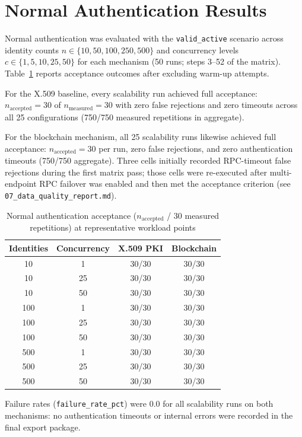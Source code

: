 
\section{Normal Authentication Results}
\label{sec:ch5-normal-auth}

Normal authentication was evaluated with the \texttt{valid\_active} scenario across identity counts $n \in \{10,50,100,250,500\}$ and concurrency levels $c \in \{1,5,10,25,50\}$ for each mechanism (50 runs; steps 3--52 of the matrix). Table~\ref{tab:ch5-acceptance} reports acceptance outcomes after excluding warm-up attempts.

For the X.509 baseline, every scalability run achieved full acceptance: $n_{\mathrm{accepted}} = 30$ of $n_{\mathrm{measured}} = 30$ with zero false rejections and zero timeouts across all 25 configurations (750/750 measured repetitions in aggregate).

For the blockchain mechanism, all 25 scalability runs likewise achieved full acceptance: $n_{\mathrm{accepted}} = 30$ per run, zero false rejections, and zero authentication timeouts (750/750 aggregate). Three cells initially recorded RPC-timeout false rejections during the first matrix pass; those cells were re-executed after multi-endpoint RPC failover was enabled and then met the acceptance criterion (see \texttt{07\_data\_quality\_report.md}).

\begin{table}[htbp]
    \centering
    \caption{Normal authentication acceptance ($n_{\mathrm{accepted}}$ / 30 measured repetitions) at representative workload points}
    \label{tab:ch5-acceptance}
    \begin{tabular}{|c|c|c|c|}
        \hline
        \textbf{Identities} & \textbf{Concurrency} & \textbf{X.509 PKI} & \textbf{Blockchain} \\
        \hline
        10  & 1  & 30/30 & 30/30 \\
        10  & 25 & 30/30 & 30/30 \\
        10  & 50 & 30/30 & 30/30 \\
        100 & 1  & 30/30 & 30/30 \\
        100 & 25 & 30/30 & 30/30 \\
        100 & 50 & 30/30 & 30/30 \\
        500 & 1  & 30/30 & 30/30 \\
        500 & 25 & 30/30 & 30/30 \\
        500 & 50 & 30/30 & 30/30 \\
        \hline
    \end{tabular}
\end{table}

Failure rates (\texttt{failure\_rate\_pct}) were 0.0 for all scalability runs on both mechanisms: no authentication timeouts or internal errors were recorded in the final export package.
